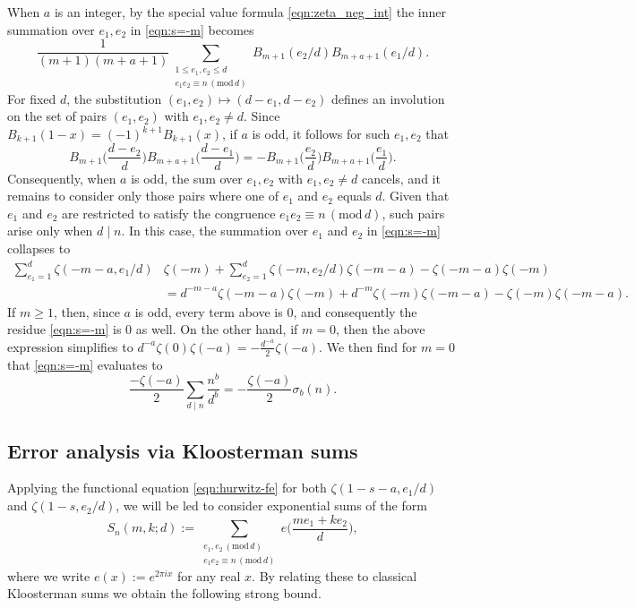 \documentclass[12pt]{amsart}
\numberwithin{equation}{section}
\numberwithin{theorem}{section}
\renewcommand{\pmod}[1]{\,\left(\mathrm{mod}\,#1\right)}
\begin{document}
When $a$ is an integer,
by the special value formula \eqref{eqn:zeta_neg_int} the inner summation over $e_1,e_2$ in \eqref{eqn:s=-m} becomes
\[
	\frac{1}{(m+1)(m+a+1)} \sum_{\substack{ 1 \leq e_1,e_2 \leq d \\ e_1e_2 \equiv n \pmod{d}}} B_{m+1}(e_2/d) B_{m+a+1}(e_1/d).
\]
For fixed $d$, the substitution $(e_1,e_2) \mapsto (d-e_1,d-e_2)$ defines an involution on the set of pairs $(e_1,e_2)$ with $e_1,e_2 \neq d$.  Since $B_{k+1}(1-x) = (-1)^{k+1}B_{k+1}(x)$, if $a$ is odd, it follows for such $e_1,e_2$ that 
\[
	B_{m+1}\Big(\frac{d-e_2}{d}\Big)B_{m+a+1}\Big(\frac{d-e_1}{d}\Big)
		= - B_{m+1}\Big(\frac{e_2}{d}\Big) B_{m+a+1}\Big(\frac{e_1}{d}\Big).
\]
Consequently, when $a$ is odd, the sum over $e_1,e_2$ with $e_1,e_2 \neq d$ cancels, and it remains to consider only those pairs where one of $e_1$ and $e_2$ equals $d$.  Given that $e_1$ and $e_2$ are restricted to satisfy the congruence $e_1e_2 \equiv n \pmod{d}$, such pairs arise only when $d \mid n$.  In this case, the summation over $e_1$ and $e_2$ in \eqref{eqn:s=-m} collapses to
\begin{align*}
	\sum_{e_1 = 1}^d \zeta(-m-a,e_1/d)&\zeta(-m) + \sum_{e_2 =1}^d \zeta(-m,e_2/d) \zeta(-m-a) - \zeta(-m-a)\zeta(-m) \\
		&= d^{-m-a} \zeta(-m-a)\zeta(-m) + d^{-m} \zeta(-m)\zeta(-m-a) - \zeta(-m)\zeta(-m-a).
\end{align*}
If $m \geq 1$, then, since $a$ is odd, every term above is $0$, and consequently the residue \eqref{eqn:s=-m} is $0$ as well.  On the other hand, if $m=0$, then the above expression simplifies to $d^{-a}\zeta(0)\zeta(-a) = -\frac{d^{-a}}{2}\zeta(-a)$.  We then find for $m=0$ that \eqref{eqn:s=-m} evaluates to
\[
	\frac{-\zeta(-a)}{2} \sum_{d \mid n} \frac{n^b}{d^b}
		= -\frac{\zeta(-a)}{2} \sigma_b(n).
\]



\subsection{Error analysis via Kloosterman sums}

Applying the functional equation \eqref{eqn:hurwitz-fe} for both $\zeta(1-s-a,e_1/d)$ and $\zeta(1-s,e_2/d)$, we will be led to consider exponential sums of the form
\[
	S_n(m,k;d)
		:= \sum_{\substack{e_1,e_2 \pmod{d} \\ e_1 e_2 \equiv n \pmod{d}}} e\Big( \frac{me_1+ke_2}{d}\Big),
\]
where we write $e(x) := e^{2\pi i x}$ for any real $x$.  By relating these to classical Kloosterman sums 
we obtain the following strong bound.
\end{document}
